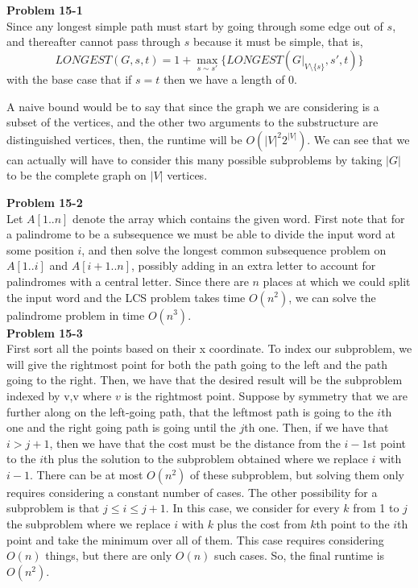 \documentclass{article}
\begin{document}
\noindent\textbf{Problem 15-1}\\

Since any longest simple path must start by going through some edge out of $s$, and thereafter cannot pass through $s$ because it must be simple, that is, 
\[
LONGEST(G,s,t) = 1+\max_{s\sim s'} \{ LONGEST(G|_{V\setminus\{s\}},s',t)\}
\]
with the base case that if $s=t$ then we have a length of 0.

A naive bound would be to say that since the graph we are considering is a subset of the vertices, and the other two arguments to the substructure are distinguished vertices, then, the runtime will be $O(|V|^2 2^{|V|})$. We can see that we can actually will have to consider this many possible subproblems by taking $|G|$ to be the complete graph on $|V|$ vertices.

\noindent\textbf{Problem 15-2}\\

Let $A[1..n]$ denote the array which contains the given word.  First note that for a palindrome to be a subsequence we must be able to divide the input word at some position $i$, and then solve the longest common subsequence problem on $A[1..i]$ and $A[i+1..n]$, possibly adding in an extra letter to account for palindromes with a central letter. Since there are $n$ places at which we could split the input word and the LCS problem takes time $O(n^2)$, we can solve the palindrome problem in time $O(n^3)$. \\

\noindent\textbf{Problem 15-3}\\

First sort all the points based on their x coordinate. To index our subproblem, we will give the rightmost point for both the path going to the left and the path going to the right. Then, we have that the desired result will be the subproblem indexed by v,v where $v$ is the rightmost point.	Suppose by symmetry that we are further along on the left-going path, that the leftmost path is going to the $i$th one and the right going path is going until the $j$th one. Then, if we have that $i>j+1$, then we have that the cost must be the distance from the $i-1$st point to the $i$th plus the solution to the subproblem obtained where we replace $i$ with $i-1$. There can be at most $O(n^2)$ of these subproblem, but solving them only requires considering a constant number of cases. The other possibility for a subproblem is that $j\le i \le j+1$. In this case, we consider for every $k$ from 1 to $j$ the subproblem where we replace $i$ with $k$ plus the cost from $k$th point to the $i$th point and take the minimum over all of them. This case requires considering $O(n)$ things, but there are only $O(n)$ such cases. So, the final runtime is $O(n^2)$.\\
\end{document}
